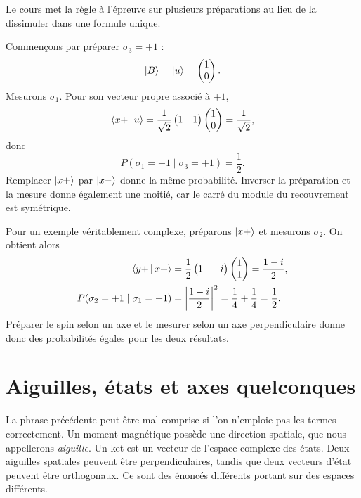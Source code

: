 Le cours met la règle à l’épreuve sur plusieurs préparations au lieu de la dissimuler dans une formule unique.

Commençons par préparer \(\sigma_3=+1\) :
\begin{equation}
  \left\lvert B\right\rangle=\left\lvert u\right\rangle=\begin{pmatrix}1\\0\end{pmatrix}.
\end{equation}
Mesurons \(\sigma_1\). Pour son vecteur propre associé à \(+1\),
\begin{equation}
  \left\langle x+\,\middle|\,u\right\rangle
  =
  \frac{1}{\sqrt2}
  \begin{pmatrix}1&1\end{pmatrix}
  \begin{pmatrix}1\\0\end{pmatrix}
  =\frac{1}{\sqrt2},
\end{equation}
donc
\begin{equation}
  P(\sigma_1=+1\mid\sigma_3=+1)=\frac12.
\end{equation}
Remplacer \(\left\lvert x+\right\rangle\) par \(\left\lvert x-\right\rangle\) donne la même probabilité. Inverser la préparation et la mesure donne également une moitié, car le carré du module du recouvrement est symétrique.

Pour un exemple véritablement complexe, préparons \(\left\lvert x+\right\rangle\) et mesurons \(\sigma_2\). On obtient alors
\begin{align}
  \left\langle y+\,\middle|\,x+\right\rangle
  &=
  \frac12
  \begin{pmatrix}1&-i\end{pmatrix}
  \begin{pmatrix}1\\1\end{pmatrix}
  =\frac{1-i}{2},
  \notag\\
  P(\sigma_2=+1\mid\sigma_1=+1)
  &=\left|\frac{1-i}{2}\right|^2
  =\frac14+\frac14
  =\frac12.
  \label{eq:l03-complex-probability-example}
\end{align}
Préparer le spin selon un axe et le mesurer selon un axe perpendiculaire donne donc des probabilités égales pour les deux résultats.

\section{Aiguilles, états et axes quelconques}

La phrase précédente peut être mal comprise si l’on n’emploie pas les termes correctement. Un moment magnétique possède une direction spatiale, que nous appellerons \emph{aiguille}. Un ket est un vecteur de l’espace complexe des états. Deux aiguilles spatiales peuvent être perpendiculaires, tandis que deux vecteurs d’état peuvent être orthogonaux. Ce sont des énoncés différents portant sur des espaces différents.

